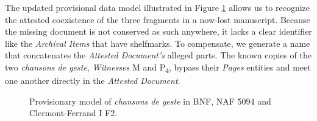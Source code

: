 
The updated provisional data model illustrated in Figure \ref{fig:AspremontCFBNF} allows us to recognize the attested coexistence of the three fragments in a now-lost manuscript. Because the missing document is not conserved as such anywhere, it lacks a clear identifier like the \textit{Archival Items} that have shelfmarks. To compensate, we generate a name that concatenates the \textit{Attested Document's} alleged parts. The known copies of the two \textit{chansons de geste}, \textit{Witnesses} M and P\textsubscript{4}, bypass their \textit{Pages} entities and meet one another directly in the \textit{Attested Document}.

\begin{figure}[ht]
    \begin{center}
        
    \end{center}
    \caption{Provisionary model of \textit{chansons de geste} in BNF, NAF 5094 and Clermont-Ferrand I F2.}
    \label{fig:AspremontCFBNF}
\end{figure}

